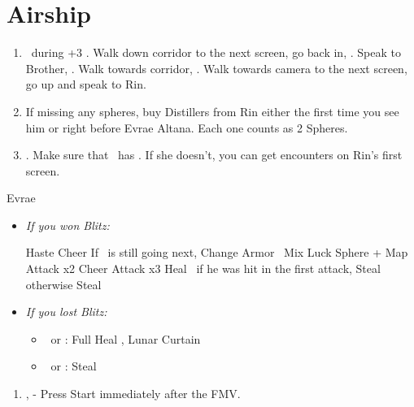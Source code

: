 \chapter{Airship}

\begin{enumerate}
  \item \sd\ during \cs+3 \skippablefmv. Walk down corridor to the next screen, go back in, \sd. Speak to Brother, \sd. Walk towards corridor, \sd. Walk towards camera to the next screen, go up and speak to Rin.
  \item If missing any spheres, buy Distillers from Rin either the first time you see him or right before Evrae Altana. Each one counts as 2 Spheres.
  \item \save. Make sure that \rikku\ has \od. If she doesn't, you can get encounters on Rin's first screen.
\end{enumerate}
\vfill
\begin{battle}[32000]{Evrae}
  \begin{itemize}
    \item \textit{If you won Blitz:}
          \begin{itemize}
            \tidusf Haste \tidus
            \tidusf Cheer
            \tidusf If \tidus\ is still going next, Change Armor
            \rikkuf \od\ Mix Luck Sphere + Map
            \tidusf Attack x2
            \tidusf Cheer
            \tidusf Attack x3
            \kimahrif Heal \tidus\ if he was hit in the first attack, Steal otherwise
            \rikkuf Steal
          \end{itemize}
    \item \textit{If you lost Blitz:}
          \begin{itemize}
            \tidusf Haste \tidus
            \tidusf Cheer x2
            \tidusf Equip Baroque Sword
            \tidusf Attack x6
            \rikkuf \od\ Mix Luck Sphere + Map
            \item \kimahri\ or \rikku: Full Heal \tidus, Lunar Curtain \tidus
            \item \kimahri\ or \rikku: Steal
          \end{itemize}
  \end{itemize}
\end{battle}
\begin{enumerate}[resume]
  \item \sd, \skippablefmv[3:00] - Press Start immediately after the FMV.
\end{enumerate}